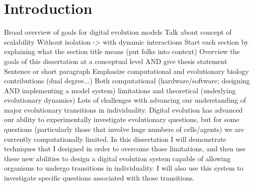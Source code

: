 \chapter{Introduction}
\label{ch:introduction}

Broad overview of goals for digital evolution models
Talk about concept of scalability
Without isolation -> with dynamic interactions
Start each section by explaining what the section title means (put folks into context)
Overview the goals of this dissertation at a conceptual level AND give thesis statement
Sentence or short paragraph
Emphasize computational and evolutionary biology contributions (dual degree...)
Both computational (hardware/software; designing AND implementing a model system) limitations and theoretical (underlying evolutionary dynamics)
Lots of challenges with advancing our understanding of major evolutionary transitions in individuality.
Digital evolution has advanced our ability to experimentally investigate evolutionary questions, but for some questions (particularly those that involve huge numbers of cells/agents) we are currently computationally limited.
In this dissertation I will demonstrate techniques that I designed in order to overcome those limitations, and then use these new abilities to design a digital evolution system capable of allowing organisms to undergo transitions in individuality.
I will also use this system to investigate specific questions associated with those transitions.


